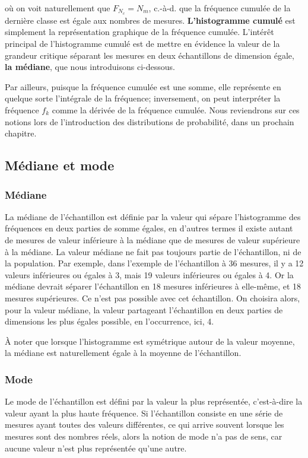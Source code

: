 \documentclass[main.tex]{subfiles}
\begin{document}
où on voit naturellement que $F_{N_c}=N_m$, c.-à-d. que la fréquence cumulée de la dernière classe est égale aux nombres de mesures. \textbf{L'histogramme cumulé} est simplement la représentation graphique de la fréquence cumulée. L'intérêt principal de l'histogramme cumulé est de mettre en évidence la valeur de la grandeur critique séparant les mesures en deux échantillons de dimension égale, \textbf{la médiane}, que nous introduisons ci-dessous.

Par ailleurs, puisque la fréquence cumulée est une somme, elle représente en quelque sorte l'intégrale de la fréquence; inversement, on peut interpréter la fréquence $f_k$ comme la dérivée de la fréquence cumulée. Nous reviendrons sur ces notions lors de l'introduction des distributions de probabilité, dans un prochain chapitre.

\subsection{Médiane et mode}

\subsubsection{Médiane}

La médiane de l'échantillon est définie par la valeur qui sépare l'histogramme des fréquences en deux parties de somme égales, en d'autres termes il existe autant de mesures de valeur inférieure à la médiane que de mesures de valeur supérieure à la médiane. La valeur médiane ne fait pas toujours partie de l'échantillon, ni de la population. Par exemple, dans l'exemple de l'échantillon à 36 mesures, il y a 12 valeurs inférieures ou égales à 3, mais 19 valeurs inférieures ou égales à 4. Or la médiane devrait séparer l'échantillon en 18 mesures inférieures à elle-même, et 18 mesures supérieures. Ce n'est pas possible avec cet échantillon. On choisira alors, pour la valeur médiane, la valeur partageant l'échantillon en deux parties de dimensions les plus égales possible, en l'occurrence, ici, 4.

À noter que lorsque l'histogramme est symétrique autour de la valeur moyenne, la médiane est naturellement égale à la moyenne de l'échantillon.

\subsubsection{Mode}

Le mode de l'échantillon est défini par la valeur la plus représentée, c'est-à-dire la valeur ayant la plus haute fréquence. Si l'échantillon consiste en une série de mesures ayant toutes des valeurs différentes, ce qui arrive souvent lorsque les mesures sont des nombres réels, alors la notion de mode n'a pas de sens, car aucune valeur n'est plus représentée qu'une autre.
\end{document}
